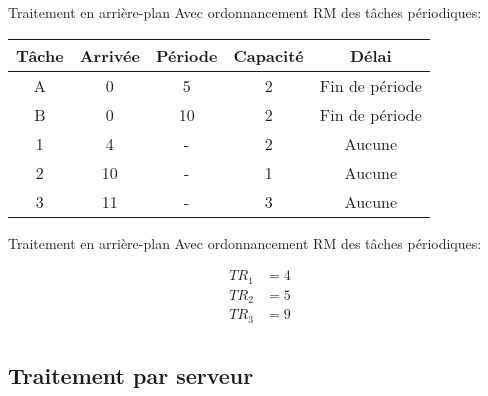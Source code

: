 \begin{frame}{Traitement en arrière-plan} 
  Avec ordonnancement RM des tâches périodiques:
  \begin{center}
    \begin{tabular}{ccccc}
      \hline
      Tâche & Arrivée & Période & Capacité & Délai \\
      \hline
      A &  0 &  5 & 2 & Fin de période\\
      B &  0 & 10 & 2 & Fin de période\\
      1 &  4 &  - & 2 & Aucune\\
      2 & 10 &  - & 1 & Aucune\\
      3 & 11 &  - & 3 & Aucune\\
      \hline
    \end{tabular}
    \pause
    
  \end{center}
\end{frame} 

\begin{frame}{Traitement en arrière-plan} 
  Avec ordonnancement RM des tâches périodiques:
  \begin{center}
    
    \begin{align*}
      TR_1 &= 4\\
      TR_2 &= 5\\
      TR_3 &= 9\\
    \end{align*}
  \end{center}
\end{frame} 

\subsection{Traitement par serveur}

